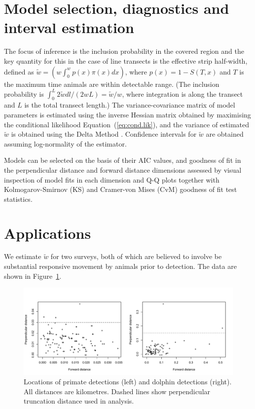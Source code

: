 \documentclass[useAMS,usenatbib,referee]{biom}
\begin{document}
\section{Model selection, diagnostics and interval estimation}

The focus of inference is the inclusion probability in the covered region and the key quantity for this in the case of line transects is the effective strip half-width, defined as $\tilde{w}=\left(w\int_0^w p(x)\pi(x)dx\right)$, where $p(x)=1-S(T,x)$ and $T$ is the maximum time animals are within detectable range. (The inclusion probability is $\int_0^L2\tilde{w}dl/(2wL)=\tilde{w}/w$, where integration is along the transect and $L$ is the total transect length.) The variance-covariance matrix of model parameters is estimated using the inverse Hessian matrix obtained by maximising the conditional likelihood Equation~(\ref{eq:cond.lik}), and the variance of estimated $\tilde{w}$ is obtained using the Delta Method \citep[see][for example]{Oehlert:92}. Confidence intervals for $\tilde{w}$ are obtained assuming log-normality of the estimator.

Models can be selected on the basis of their AIC values, and goodness of fit in the perpendicular distance and forward distance dimensions assessed by visual inspection of model fits in each dimension and Q-Q plots together with Kolmogarov-Smirnov (KS) and Cramer-von Mises (CvM) goodness of fit test statistics.


\section{Applications}

We estimate $\tilde{w}$ for two surveys, both of which are believed to involve be substantial responsive movement by animals prior to detection. The data are shown in Figure~\ref{fig:Scatterplots}.

\begin{figure}
\caption{Locations of primate detections (left) and dolphin detections (right). All distances are kilometres. Dashed lines show perpendicular truncation distance used in analysis. %
\label{fig:Scatterplots}}
\includegraphics[scale=1]{Scatterplots.pdf}
\end{figure}
\end{document}
